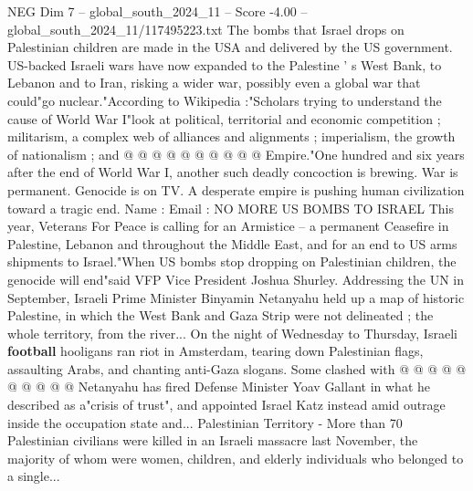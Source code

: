 \begin{textsample}{NEG Dim 7 – global\_south\_2024\_11 – Score -4.00 – global\_south\_2024\_11/117495223.txt}
The bombs that Israel drops on Palestinian children are made in the USA and delivered by the US government.
US-backed Israeli wars have now expanded to the Palestine ' s West Bank, to Lebanon and to Iran, risking a wider war, possibly even a global war that could"go nuclear."According to Wikipedia :"Scholars trying to understand the cause of World War I"look at political, territorial and economic competition ; militarism, a complex web of alliances and alignments ; imperialism, the growth of nationalism ; and @ @ @ @ @ @ @ @ @ @ Empire."One hundred and six years after the end of World War I, another such deadly concoction is brewing.
War is permanent.
Genocide is on TV.
A desperate empire is pushing human civilization toward a tragic end.
Name : Email : NO MORE US BOMBS TO ISRAEL This year, Veterans For Peace is calling for an Armistice -- a permanent Ceasefire in Palestine, Lebanon and throughout the Middle East, and for an end to US arms shipments to Israel."When US bombs stop dropping on Palestinian children, the genocide will end"said VFP Vice President Joshua Shurley.
Addressing the UN in September, Israeli Prime Minister Binyamin Netanyahu held up a map of historic Palestine, in which the West Bank and Gaza Strip were not delineated ; the whole territory, from the river...
On the night of Wednesday to Thursday, Israeli \textbf{football} hooligans ran riot in Amsterdam, tearing down Palestinian flags, assaulting Arabs, and chanting anti-Gaza slogans.
Some clashed with @ @ @ @ @ @ @ @ @ @ Netanyahu has fired Defense Minister Yoav Gallant in what he described as a"crisis of trust", and appointed Israel Katz instead amid outrage inside the occupation state and...
Palestinian Territory - More than 70 Palestinian civilians were killed in an Israeli massacre last November, the majority of whom were women, children, and elderly individuals who belonged to a single...

\end{textsample}
